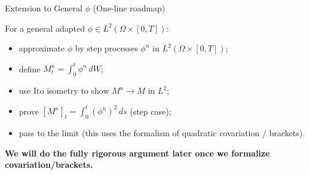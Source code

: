 \documentclass[10pt,aspectratio=169]{beamer}
\begin{document}
\begin{frame}{Extension to General $\phi$ (One-line roadmap)}

For a general adapted $\phi\in L^2(\Omega\times[0,T])$:
\pause
\begin{itemize}
  \item approximate $\phi$ by step processes $\phi^n$ in
  $L^2(\Omega\times[0,T])$;\pause
  \item define $M^n_t=\int_0^t \phi^n\,dW$;\pause
  \item use Ito isometry to show $M^n\to M$ in $L^2$;\pause
  \item prove $[M^n]_t=\int_0^t (\phi^n)^2\,ds$ (step case);\pause
  \item pass to the limit (this uses the formalism of quadratic covariation / brackets).\pause
\end{itemize}

\medskip
\textbf{We will do the fully rigorous argument later once we formalize covariation/brackets.}

\end{frame}
\end{document}

